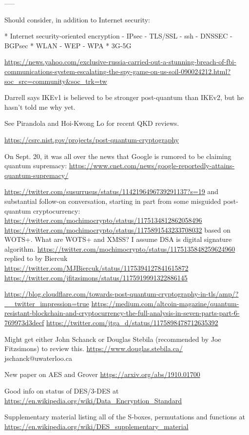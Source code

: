 \documentclass[%
 aip,
 jmp,%
 amsmath,amssymb,
 reprint,%
]{revtex4-1}
\begin{document}
-----

Should consider, in addition to Internet security:

* Internet security-oriented encryption
  - IPsec
  - TLS/SSL
  - ssh
  - DNSSEC
  - BGPsec
* WLAN
  - WEP
  - WPA
* 3G-5G

\url{https://news.yahoo.com/exclusive-russia-carried-out-a-stunning-breach-of-fbi-communications-system-escalating-the-spy-game-on-us-soil-090024212.html?soc_src=community&soc_trk=tw}

Darrell says IKEv1 is believed to be stronger post-quantum than IKEv2,
but he hasn't told me why yet.

See Pirandola and Hoi-Kwong Lo for recent QKD reviews.

\url{https://csrc.nist.gov/projects/post-quantum-cryptography}

On Sept. 20, it was all over the news that Google is rumored to be
claiming quantum supremacy:
\url{https://www.cnet.com/news/google-reportedly-attains-quantum-supremacy/}

\url{https://twitter.com/susurrusus/status/1142196496739291137?s=19}
and substantial follow-on conversation, starting in part from some
misguided post-quantum cryptocurrency:
\url{https://twitter.com/mochimocrypto/status/1175134812862058496}
\url{https://twitter.com/mochimocrypto/status/1175891543233708032}
based on WOTS+.
What are WOTS+ and XMSS?  I assume DSA is digital signature algorithm.
\url{https://twitter.com/mochimocrypto/status/1175135848259624960}
replied to by Biercuk
\url{https://twitter.com/MJBiercuk/status/1175394127841615872}
\url{https://twitter.com/jfitzsimons/status/1175919991322886145}

\url{https://blog.cloudflare.com/towards-post-quantum-cryptography-in-tls/amp/?__twitter_impression=true}
\url{https://medium.com/altcoin-magazine/quantum-resistant-blockchain-and-cryptocurrency-the-full-analysis-in-seven-parts-part-6-769973d3decf}
\url{https://twitter.com/jtga_d/status/1175898478712635392}

Might get either John Schanck or Douglas Stebila (recommended by Joe
Fitzsimons) to review this.
\url{https://www.douglas.stebila.ca/}
jschanck@uwaterloo.ca

New paper on AES and Grover
\url{https://arxiv.org/abs/1910.01700}

Good info on status of DES/3-DES at
\url{https://en.wikipedia.org/wiki/Data_Encryption_Standard}

Supplementary material listing all of the S-boxes, permutations and
functions at
\url{https://en.wikipedia.org/wiki/DES_supplementary_material}
\end{document}
